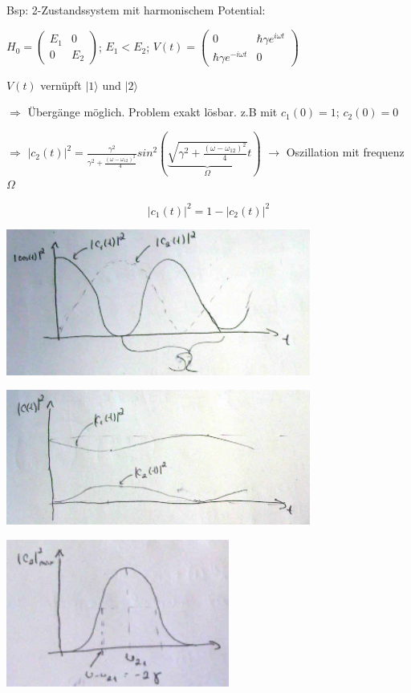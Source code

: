 Bsp: 2-Zustandssystem mit harmonischem Potential:


\(H_0 =\begin{pmatrix} E_1& 0\\0&E_2\end{pmatrix}\); \(E_1<E_2\); \(V(t) =\begin{pmatrix}0&\hbar \gamma e^{i\omega t}\\\hbar \gamma e^{-i\omega t}&0 \end{pmatrix}\)


\(V(t)\) vernüpft \(|1\rangle\) und \(|2\rangle\)


\(\Rightarrow\) Übergänge möglich. Problem exakt lösbar. z.B mit \(c_1(0)=1\); \(c_2(0)=0\)


\(\Rightarrow\) \(|c_2(t)|^2=\frac{\gamma^2}{\gamma^2+\frac{(\omega-\omega_{12})^2}{4}}sin^2\left( \underbrace{\sqrt{\gamma^2+\frac{(\omega-\omega_{12})^2}{4}}}_{\Omega}t\right)\) \(\rightarrow\) Oszillation mit frequenz \(\Omega\)

 \[|c_1(t)|^2 = 1-|c_2(t)|^2\]



\includegraphics[width=0.75\textwidth]{kap03_04.png}


\includegraphics[width=0.75\textwidth]{kap03_05.png}


\includegraphics[width=0.55\textwidth]{kap03_06.png}


